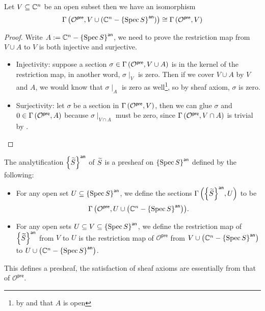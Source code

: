 \begin{corollary}
  Let $V\subseteq\mathbb{C}^{n}$ be an open subset then we have an isomorphism
  \[
{\Gamma\left(\mathcal{O}^{\mathsf{pre}},V \cup (\mathbb{C}^{n} - {\left\{{\operatorname{Spec} S}\right\}}^{\mathsf{an}})\right)} \cong {\Gamma\left(\mathcal{O}^{\mathsf{pre}},V\right)}
  \]
\end{corollary}
\begin{proof}
  Write $A := \mathbb{C}^{n}-{\left\{{\operatorname{Spec} S}\right\}}^{\mathsf{an}}$, we need to prove the restriction map from $V \cup A$ to $V$ is both injective and surjective.
  \begin{itemize}
	\item Injectivity: suppose a section $\sigma \in {\Gamma\left(\mathcal{O}^{\mathsf{pre}},V \cup A\right)}$ is in the kernel of the restriction map, in another word, $\sigma\mid_{V}$ is zero. Then if we cover $V \cup A$ by $V$ and $A$, we would know that $\sigma\mid_{A}$ is zero as well\footnote{by  and that $A$ is open}, so by sheaf axiom, $\sigma$ is zero.
	\item Surjectivity: let $\sigma$ be a section in ${\Gamma\left(\mathcal{O}^{\mathsf{pre}},V\right)}$, then we can glue $\sigma$ and $0 \in {\Gamma\left(\mathcal{O}^{\mathsf{pre}},A\right)}$ because $\sigma\mid_{V \cap A}$ must be zero, since ${\Gamma\left(\mathcal{O}^{\mathsf{pre}},V\cap A\right)}$ is trivial by .
  \end{itemize}
\end{proof}

\begin{definition}\label{def:analytification-sheaf-affine}
  The analytification ${\left\{{\widetilde{S}}\right\}}^{\mathsf{an}}$ of $\widetilde{S}$ is a presheaf on ${\left\{{\operatorname{Spec} S}\right\}}^{\mathsf{an}}$ defined by the following:
  \begin{itemize}
	\item For any open set $U \subseteq {\left\{{\ensuremath{\operatorname{Spec}}S}\right\}}^{\mathsf{an}}$, we define the sections ${\Gamma\left({\left\{{\widetilde{S}}\right\}}^{\mathsf{an}},U\right)}$ to be
		  $${\Gamma\left(\mathcal{O}^{\mathsf{pre}},U \cup \left(\mathbb{C}^{n}-{\left\{{\operatorname{Spec} S}\right\}}^{\mathsf{an}}\right)\right)}.$$
	\item For any open sets $U \subseteq V \subseteq {\left\{{\ensuremath{\operatorname{Spec}}{S}}\right\}}^{\mathsf{an}}$, we define the restriction map of ${\left\{{\widetilde{S}}\right\}}^{\mathsf{an}}$ from $V$ to $U$ is the restriction map of $\mathcal{O}^{\mathsf{pre}}$ from $V \cup \left(\mathbb{C}^{n}-{\left\{{\operatorname{Spec} S}\right\}}^{\mathsf{an}}\right)$ to $U \cup \left(\mathbb{C}^{n}-{\left\{{\operatorname{Spec}{S}}\right\}}^{\mathsf{an}}\right)$.
  \end{itemize}
This defines a presheaf, the satisfaction of sheaf axioms are essentially from that of $\mathcal{O}^{\mathsf{pre}}$.
\end{definition}

